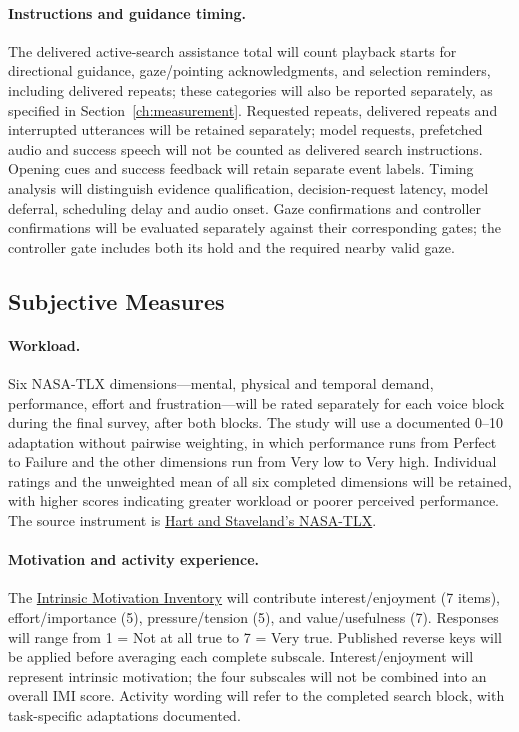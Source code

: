 \paragraph{Instructions and guidance timing.} The delivered active-search assistance total will count playback starts for directional guidance, gaze/pointing acknowledgments, and selection reminders, including delivered repeats; these categories will also be reported separately, as specified in Section~\ref{ch:measurement}. Requested repeats, delivered repeats and interrupted utterances will be retained separately; model requests, prefetched audio and success speech will not be counted as delivered search instructions. Opening cues and success feedback will retain separate event labels. Timing analysis will distinguish evidence qualification, decision-request latency, model deferral, scheduling delay and audio onset. Gaze confirmations and controller confirmations will be evaluated separately against their corresponding gates; the controller gate includes both its hold and the required nearby valid gaze.

\subsection{Subjective Measures}
\paragraph{Workload.} Six NASA-TLX dimensions---mental, physical and temporal demand, performance, effort and frustration---will be rated separately for each voice block during the final survey, after both blocks. The study will use a documented 0--10 adaptation without pairwise weighting, in which performance runs from Perfect to Failure and the other dimensions run from Very low to Very high. Individual ratings and the unweighted mean of all six completed dimensions will be retained, with higher scores indicating greater workload or poorer perceived performance. The source instrument is \href{https://doi.org/10.1016/S0166-4115(08)62386-9}{Hart and Staveland's NASA-TLX}.

\paragraph{Motivation and activity experience.} The \href{https://selfdeterminationtheory.org/intrinsic-motivation-inventory/}{Intrinsic Motivation Inventory} will contribute interest/enjoyment (7 items), effort/importance (5), pressure/tension (5), and value/usefulness (7). Responses will range from 1 = Not at all true to 7 = Very true. Published reverse keys will be applied before averaging each complete subscale. Interest/enjoyment will represent intrinsic motivation; the four subscales will not be combined into an overall IMI score. Activity wording will refer to the completed search block, with task-specific adaptations documented.

